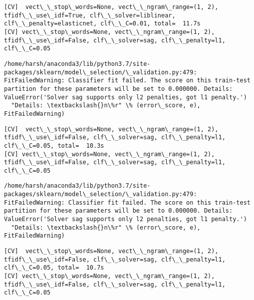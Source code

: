 \documentclass[11pt]{article}
\begin{document}
    \begin{Verbatim}[commandchars=\\\{\}]
[CV]  vect\_\_stop\_words=None, vect\_\_ngram\_range=(1, 2), tfidf\_\_use\_idf=True, clf\_\_solver=liblinear, clf\_\_penalty=elasticnet, clf\_\_C=0.01, total=  11.7s
[CV] vect\_\_stop\_words=None, vect\_\_ngram\_range=(1, 2), tfidf\_\_use\_idf=False, clf\_\_solver=sag, clf\_\_penalty=l1, clf\_\_C=0.05 

    \end{Verbatim}

    \begin{Verbatim}[commandchars=\\\{\}]
/home/harsh/anaconda3/lib/python3.7/site-packages/sklearn/model\_selection/\_validation.py:479: FitFailedWarning: Classifier fit failed. The score on this train-test partition for these parameters will be set to 0.000000. Details: 
ValueError('Solver sag supports only l2 penalties, got l1 penalty.')
  "Details: \textbackslash{}n\%r" \% (error\_score, e), FitFailedWarning)

    \end{Verbatim}

    \begin{Verbatim}[commandchars=\\\{\}]
[CV]  vect\_\_stop\_words=None, vect\_\_ngram\_range=(1, 2), tfidf\_\_use\_idf=False, clf\_\_solver=sag, clf\_\_penalty=l1, clf\_\_C=0.05, total=  10.3s
[CV] vect\_\_stop\_words=None, vect\_\_ngram\_range=(1, 2), tfidf\_\_use\_idf=False, clf\_\_solver=sag, clf\_\_penalty=l1, clf\_\_C=0.05 

    \end{Verbatim}

    \begin{Verbatim}[commandchars=\\\{\}]
/home/harsh/anaconda3/lib/python3.7/site-packages/sklearn/model\_selection/\_validation.py:479: FitFailedWarning: Classifier fit failed. The score on this train-test partition for these parameters will be set to 0.000000. Details: 
ValueError('Solver sag supports only l2 penalties, got l1 penalty.')
  "Details: \textbackslash{}n\%r" \% (error\_score, e), FitFailedWarning)

    \end{Verbatim}

    \begin{Verbatim}[commandchars=\\\{\}]
[CV]  vect\_\_stop\_words=None, vect\_\_ngram\_range=(1, 2), tfidf\_\_use\_idf=False, clf\_\_solver=sag, clf\_\_penalty=l1, clf\_\_C=0.05, total=  10.7s
[CV] vect\_\_stop\_words=None, vect\_\_ngram\_range=(1, 2), tfidf\_\_use\_idf=False, clf\_\_solver=sag, clf\_\_penalty=l1, clf\_\_C=0.05 

    \end{Verbatim}
\end{document}
